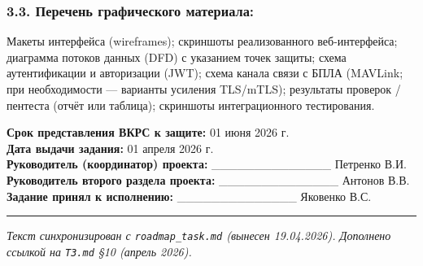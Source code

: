 \hypertarget{ux43fux435ux440ux435ux447ux435ux43dux44c-ux433ux440ux430ux444ux438ux447ux435ux441ux43aux43eux433ux43e-ux43cux430ux442ux435ux440ux438ux430ux43bux430-1}{%
\subsubsection{3.3. Перечень графического материала:}\label{ux43fux435ux440ux435ux447ux435ux43dux44c-ux433ux440ux430ux444ux438ux447ux435ux441ux43aux43eux433ux43e-ux43cux430ux442ux435ux440ux438ux430ux43bux430-1}}

Макеты интерфейса (wireframes); скриншоты реализованного веб-интерфейса; диаграмма потоков данных (DFD) с указанием точек защиты; схема аутентификации и авторизации (JWT); схема канала связи с БПЛА (MAVLink; при необходимости --- варианты усиления TLS/mTLS); результаты проверок / пентеста (отчёт или таблица); скриншоты интеграционного тестирования.

\textbf{Срок представления ВКРС к защите:} 01 июня 2026 г.\\
\textbf{Дата выдачи задания:} 01 апреля 2026 г.\\
\textbf{Руководитель (координатор) проекта:} \_\_\_\_\_\_\_\_\_\_\_\_\_\_ Петренко В.И.\\
\textbf{Руководитель второго раздела проекта:} \_\_\_\_\_\_\_\_\_\_\_\_\_\_ Антонов В.В.\\
\textbf{Задание принял к исполнению:} \_\_\_\_\_\_\_\_\_\_\_\_\_\_ Яковенко В.С.

\begin{center}\rule{0.5\linewidth}{0.5pt}\end{center}

\emph{Текст синхронизирован с \texttt{roadmap\_task.md} (вынесен 19.04.2026). Дополнено ссылкой на \texttt{ТЗ.md} §10 (апрель 2026).}
